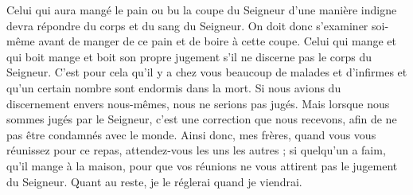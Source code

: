 Celui qui aura mangé le pain ou bu la coupe du Seigneur d’une manière indigne devra répondre du corps et du sang du Seigneur.
On doit donc s’examiner soi-même avant de manger de ce pain et de boire à cette coupe.
Celui qui mange et qui boit mange et boit son propre jugement s’il ne discerne pas le corps du Seigneur.
C’est pour cela qu’il y a chez vous beaucoup de malades et d’infirmes et qu’un certain nombre sont endormis dans la mort.
Si nous avions du discernement envers nous-mêmes, nous ne serions pas jugés.
Mais lorsque nous sommes jugés par le Seigneur, c’est une correction que nous recevons, afin de ne pas être condamnés avec le monde.
Ainsi donc, mes frères, quand vous vous réunissez pour ce repas, attendez-vous les uns les autres ;
si quelqu’un a faim, qu’il mange à la maison, pour que vos réunions ne vous attirent pas le jugement du Seigneur. Quant au reste, je le réglerai quand je viendrai.